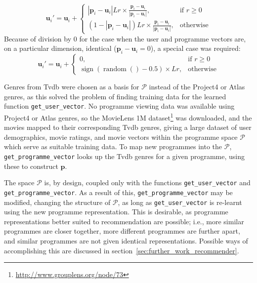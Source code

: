 $$
	\mathbf{u}_{i}' =
	\mathbf{u}_{i} + \begin{cases}
		\left|\mathbf{p}_{i}-\mathbf{u}_{i}\right|Lr \times \frac{\mathbf{p}_{i}-\mathbf{u}_{i}}{\left|\mathbf{p}_{i}-\mathbf{u}_{i}\right|},&
			\text{if } r\geq 0\\
		(1-\left|\mathbf{p}_{i}-\mathbf{u}_{i}\right|)Lr \times \frac{\mathbf{p}_{i}-\mathbf{u}_{i}}{\left|\mathbf{p}_{i}-\mathbf{u}_{i}\right|},&
			\text{otherwise}
	\end{cases}
$$
Because of division by 0 for the case when the user and programme vectors are, on a particular dimension, identical ($\mathbf{p}_{i}-\mathbf{u}_{i}=0$), a special case was required:
$$
	\mathbf{u}_{i}' =
	\mathbf{u}_{i} + \begin{cases}
		0,&
			\text{if } r\geq 0\\
		\operatorname{sign}(\operatorname{random}()-0.5)\times Lr,&
			\text{otherwise}
	\end{cases}
$$

Genres from Tvdb were chosen as a basis for $\mathcal{P}$ instead of the Project4 or Atlas genres, as this solved the problem of finding training data for the learned function \texttt{get\_user\_vector}. No programme viewing data was available using Project4 or Atlas genres, so the MovieLens 1M dataset\footnote{\url{http://www.grouplens.org/node/73}} was downloaded, and the movies mapped to their corresponding Tvdb genres, giving a large dataset of user demographics, movie ratings, and movie vectors within the programme space $\mathcal{P}$ which serve as suitable training data. To map new programmes into the $\mathcal{P}$, \texttt{get\_programme\_vector} looks up the Tvdb genres for a given programme, using these to construct $\mathbf{p}$.

The space $\mathcal{P}$ is, by design, coupled only with the functions \texttt{get\_user\_vector} and \texttt{get\_programme\_vector}. As a result of this, \texttt{get\_programme\_vector} may be modified, changing the structure of $\mathcal{P}$, as long as \texttt{get\_user\_vector} is re-learnt using the new programme representation. This is desirable, as programme representations better suited to recommendation are possible; i.e., more similar programmes are closer together, more different programmes are further apart, and similar programmes are not given identical representations. Possible ways of accomplishing this are discussed in section~\ref{sec:further_work_recommender}.



